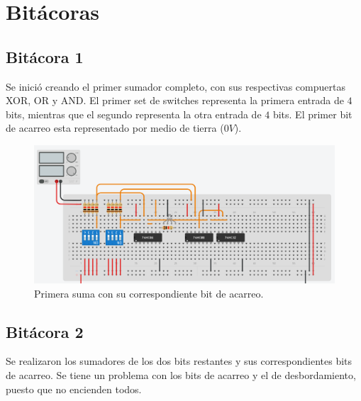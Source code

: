  

\section{Bitácoras}

\subsection{Bitácora 1}

Se inició creando el primer sumador completo, con sus respectivas compuertas XOR, OR y AND. El primer set de switches representa la primera entrada de $4$ bits, mientras que el segundo representa la otra entrada de $4$ bits. El primer bit de acarreo esta representado por medio de tierra ($0V$).


\begin{figure}[H]
	\centering
	\includegraphics[scale=0.25]{Images/Parte1SC1.png}
	\caption{Primera suma con su correspondiente bit de acarreo.}
	\label{p1sc1}
\end{figure}

\subsection{Bitácora 2}

Se realizaron los sumadores de los dos bits restantes y sus correspondientes bits de acarreo. Se tiene un problema con los bits de acarreo y el de desbordamiento, puesto que no encienden todos.


